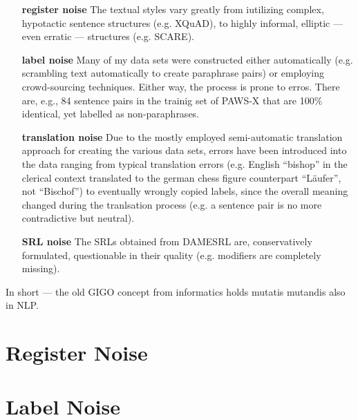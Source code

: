 \begin{itemize}
  \item[\textbf{register noise}] The textual styles vary greatly from iutilizing complex,
                                 hypotactic sentence structures (e.g. XQuAD), to highly
                                 informal, elliptic --- even erratic --- structures
                                 (e.g. SCARE).
 \item[\textbf{label noise}] Many of my data sets were constructed either automatically
                             (e.g. scrambling text automatically to create paraphrase pairs)
                             or employing crowd-sourcing techniques. Either way, the process
                             is prone to erros. There are, e.g., 84 sentence pairs in the trainig
                             set of PAWS-X that are 100\% identical, yet labelled as non-paraphrases.
 \item[\textbf{translation noise}] Due to the mostly employed semi-automatic translation
                                   approach for creating the various data sets, errors
                                   have been introduced into the data ranging from typical
                                   translation errors (e.g. English ``bishop'' in the clerical
                                   context translated to the german chess figure counterpart
                                   ``Läufer'', not ``Bischof'') to eventually wrongly copied
                                   labels, since the overall meaning changed during
                                   the tranlsation process (e.g. a sentence pair is no more
                                   contradictive but neutral).
 \item[\textbf{SRL noise}] The SRLs obtained from DAMESRL are, conservatively formulated,
                           questionable in their quality (e.g. modifiers are completely missing).
\end{itemize}

In short --- the old GIGO concept from informatics holds mutatis mutandis also in NLP.

\section{Register Noise}
\label{sec:register-noise}

\section{Label Noise}
\label{sec:label-noise}

